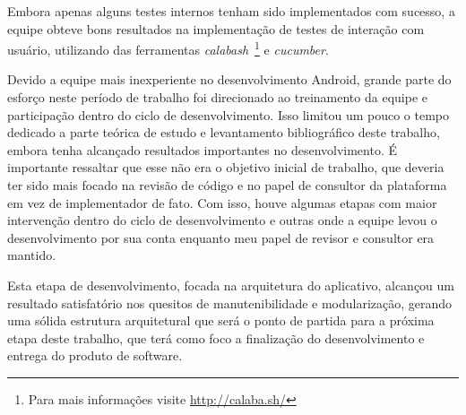 Embora apenas alguns testes internos tenham sido implementados com sucesso, a equipe obteve bons resultados na implementação de testes de interação com usuário, utilizando das ferramentas \textit{calabash}~\footnote{Para mais informações visite \url{http://calaba.sh/}} e  \textit{cucumber}.

Devido a equipe mais inexperiente no desenvolvimento Android, grande parte do esforço neste período de trabalho foi direcionado ao treinamento da equipe e participação dentro do ciclo de desenvolvimento. Isso limitou um pouco o tempo dedicado a parte teórica  de estudo e levantamento bibliográfico deste trabalho, embora tenha alcançado resultados importantes no desenvolvimento. É importante ressaltar que esse não era o objetivo inicial de trabalho, que deveria ter sido mais focado na revisão de código e no papel de consultor da plataforma em vez de implementador de fato. Com isso, houve algumas etapas com maior intervenção dentro do ciclo de desenvolvimento e outras onde a equipe levou o desenvolvimento por sua conta enquanto meu papel de revisor e consultor era mantido.

Esta etapa de desenvolvimento, focada na arquitetura do aplicativo, alcançou um resultado satisfatório nos quesitos de manutenibilidade e modularização, gerando uma sólida estrutura arquitetural que será o ponto de partida para a próxima etapa deste trabalho, que terá como foco a finalização do desenvolvimento e entrega do produto de software.
